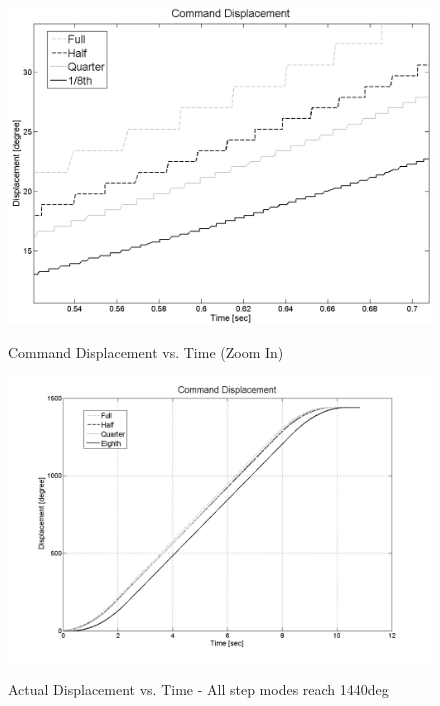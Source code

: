 \documentclass{article}
\theoremstyle{plain}
\theoremstyle{definition}
\theoremstyle{remark}
\begin{document}
\begin{figure}[hbt]
\begin{center}
\includegraphics[width=12cm]{Q4_CommandPosition_L.png}
\caption{Command Displacement vs. Time (Zoom In)} \label{tex}
\label{fig:q4_8}
\end{center}
\end{figure}

\begin{figure}[h]
\begin{center}
\includegraphics[width=12cm]{Q4_ActualPosition.png}
\caption{Actual Displacement vs. Time - All step modes reach 1440deg} \label{tex}
\label{fig:q4_9}
\end{center}
\end{figure}
\end{document}
